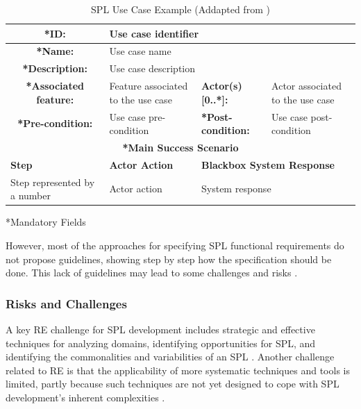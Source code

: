 \begin{table}[]
\centering
\scriptsize
\caption{SPL Use Case Example (Addapted from \citep{de2014defining})}
\label{table:use-case}
\begin{tabular}{|l|l|l|l|}
\hline
\multicolumn{1}{|c|}{\textbf{*ID:}} & \multicolumn{3}{l|}{Use case identifier} \\ \hline 

\multicolumn{1}{|c|}{\textbf{*Name:}} & \multicolumn{3}{l|}{Use case name} \\ \hline 

\multicolumn{1}{|c|}{\textbf{*Description:}} & \multicolumn{3}{l|}{Use case description} \\ \hline 

\multicolumn{1}{|c|}{\textbf{*Associated feature:}} & Feature associated to the
use case & \textbf{Actor(s) [0..*]:} & Actor associated to the use case \\ \hline

\multicolumn{1}{|c|}{\textbf{*Pre-condition:}} & Use case pre-condition &
\textbf{*Post-condition:} & Use case post-condition \\ \hline

\multicolumn{4}{|c|}{\textbf{*Main Success Scenario}} 
\\ \hline

\multicolumn{1}{|l|}{\textbf{Step}} & \multicolumn{1}{|l|}{\textbf{Actor
Action}} & \multicolumn{2}{|l|}{\textbf{Blackbox System Response}} \\ \hline 

\multicolumn{1}{|l|}{Step represented by a number} & \multicolumn{1}{|l|}{Actor
action} & \multicolumn{2}{|l|}{System response} \\ \hline
\end{tabular}
*Mandatory Fields
\end{table}

However, most of the approaches for specifying \ac{SPL} functional requirements
do not propose guidelines, showing step by step how the specification should be
done. This lack of guidelines may lead to some challenges and risks \citep{de2014defining}.

\subsubsection{Risks and Challenges}

A key \ac{RE} challenge for \ac{SPL} development includes strategic and
effective techniques for analyzing domains, identifying opportunities for \ac{SPL}, and identifying 
the commonalities and variabilities of an \ac{SPL} \citep{cheng2007research}. Another challenge 
related to \ac{RE} is that the applicability of more systematic techniques and tools is limited, 
partly because such techniques are not yet designed to cope with \ac{SPL} development’s inherent 
complexities \citep{birk2003report}.

